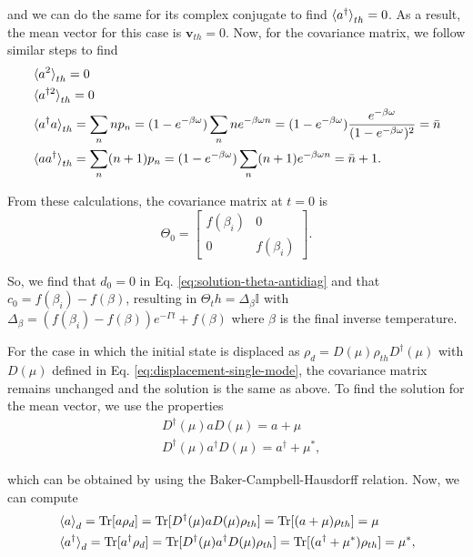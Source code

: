 \begin{apendicesenv}
\noindent and we can do the same for its complex conjugate to find $\braket{a^\dagger}_{th} = 0$. As a result, the mean vector for this case is $\mathbf{v}_{th} = 0$. Now, for the covariance matrix, we follow similar steps to find
\begin{align}
	&\braket{a^2}_{th} = 0\\
	& \braket{a^{\dagger 2}}_{th} = 0\\
	&\braket{a^\dagger a}_{th} = \sum_n n p_n = (1- e^{-\beta \omega}) \sum_n n e^{-\beta \omega n} = (1- e^{-\beta \omega}) \frac{e^{-\beta \omega}}{(1- e^{-\beta \omega})^2} = \bar{n}\\
	&\braket{a a^\dagger}_{th} = \sum_n (n+1) p_n = (1- e^{-\beta \omega}) \sum_n (n+1) e^{-\beta \omega n} = \bar{n} + 1.
\end{align}

\noindent From these calculations, the covariance matrix at $t=0$ is
\begin{equation}
	\Theta_{0} = 
	\begin{bmatrix}
		f(\beta_i) & 0\\
		0 & f(\beta_i)
        \end{bmatrix}.
\end{equation}

\noindent So, we find that $d_0 = 0$ in Eq. \eqref{eq:solution-theta-antidiag} and that $c_0 = f(\beta_i) - f(\beta)$, resulting in $\Theta_th = \Delta_\beta \mathbb{I}$ with $\Delta_\beta = (f(\beta_i) - f(\beta)) e^{-\Gamma t} + f(\beta)$ where $\beta$ is the final inverse temperature.

For the case in which the initial state is displaced as $\rho_d = D (\mu) \rho_{th} D^\dagger (\mu)$ with $D (\mu)$ defined in Eq. \eqref{eq:displacement-single-mode}, the covariance matrix remains unchanged and the solution is the same as above. To find the solution for the mean vector, we use the properties
\begin{align}
	&D^\dagger (\mu) a D (\mu) = a + \mu\\
	&D^\dagger (\mu) a^\dagger D (\mu) = a^\dagger + \mu^*,
\end{align}

\noindent which can be obtained by using the Baker-Campbell-Hausdorff relation. Now, we can compute
\begin{align}
	&\braket{a}_{d} = \text{Tr} [a \rho_{d}] = \text{Tr} [D^\dagger (\mu) a D (\mu) \rho_{th}] = \text{Tr} [(a + \mu) \rho_{th}] = \mu \\
	&\braket{a^\dagger}_{d} = \text{Tr} [a^\dagger \rho_{d}] = \text{Tr} [D^\dagger (\mu) a^\dagger D (\mu) \rho_{th}] = \text{Tr} [(a^\dagger + \mu^*) \rho_{th}] = \mu^*,
\end{align}


\end{apendicesenv}
